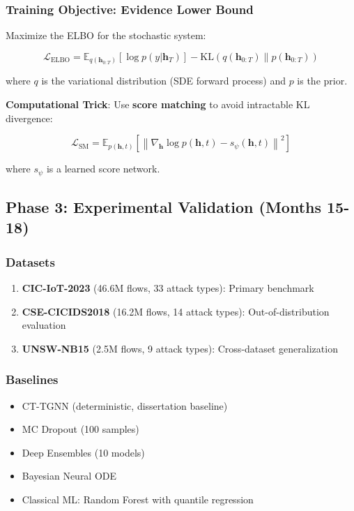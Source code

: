\documentclass[11pt]{article}
\begin{document}
\subsubsection{Training Objective: Evidence Lower Bound}

Maximize the ELBO for the stochastic system:

\begin{equation}
\mathcal{L}_{\text{ELBO}} = \mathbb{E}_{q(\mathbf{h}_{0:T})} \left[\log p(y | \mathbf{h}_T)\right] - \text{KL}\left(q(\mathbf{h}_{0:T}) \| p(\mathbf{h}_{0:T})\right)
\end{equation}

where $q$ is the variational distribution (SDE forward process) and $p$ is the prior.

\textbf{Computational Trick}: Use \textbf{score matching} to avoid intractable KL divergence:

\begin{equation}
\mathcal{L}_{\text{SM}} = \mathbb{E}_{p(\mathbf{h}, t)} \left[\left\| \nabla_{\mathbf{h}} \log p(\mathbf{h}, t) - s_\psi(\mathbf{h}, t) \right\|^2\right]
\end{equation}

where $s_\psi$ is a learned score network.

\subsection{Phase 3: Experimental Validation (Months 15-18)}

\subsubsection{Datasets}

\begin{enumerate}
    \item \textbf{CIC-IoT-2023} (46.6M flows, 33 attack types): Primary benchmark
    \item \textbf{CSE-CICIDS2018} (16.2M flows, 14 attack types): Out-of-distribution evaluation
    \item \textbf{UNSW-NB15} (2.5M flows, 9 attack types): Cross-dataset generalization
\end{enumerate}

\subsubsection{Baselines}

\begin{itemize}
    \item CT-TGNN (deterministic, dissertation baseline)
    \item MC Dropout (100 samples)
    \item Deep Ensembles (10 models)
    \item Bayesian Neural ODE
    \item Classical ML: Random Forest with quantile regression
\end{itemize}
\end{document}
